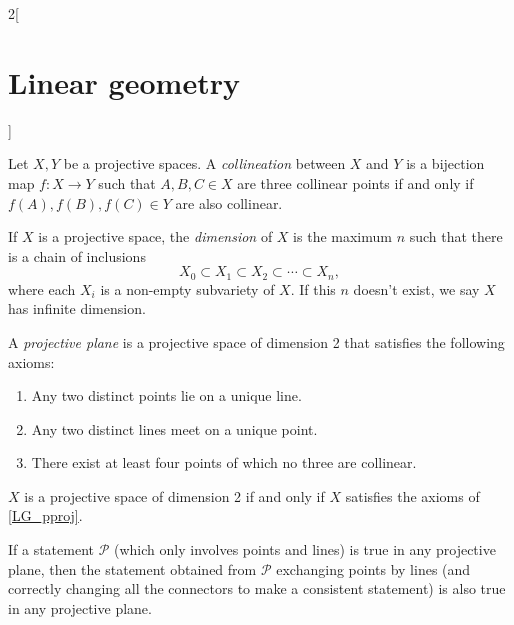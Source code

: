 \documentclass[../../../main.tex]{subfiles}
\begin{document}
\begin{multicols}{2}[\section{Linear geometry}]
\begin{proposition}
  \end{proposition}
  \begin{definition}
    Let $X,Y$ be a projective spaces. A \emph{collineation} between $X$ and $Y$ is a bijection map $f:X\rightarrow Y$ such that $A,B,C\in X$ are three collinear points if and only if $f(A),f(B),f(C)\in Y$ are also collinear.
  \end{definition}
  \begin{definition}
    If $X$ is a projective space, the \emph{dimension} of $X$ is the maximum $n$ such that there is a chain of inclusions $$X_0\subset X_1\subset X_2 \subset\cdots\subset X_n,$$ where each $X_i$ is a non-empty subvariety of $X$. If this $n$ doesn't exist, we say $X$ has infinite dimension.
  \end{definition}
  \begin{definition}\label{LG_pproj}
    A \emph{projective plane} is a projective space of dimension 2 that satisfies the following axioms:
    \begin{enumerate}
      \item Any two distinct points lie on a unique line.
      \item Any two distinct lines meet on a unique point.
      \item There exist at least four points of which no three are collinear.
    \end{enumerate}
  \end{definition}
  \begin{theorem}
    $X$ is a projective space of dimension 2 if and only if $X$ satisfies the axioms of \cref{LG_pproj}.
  \end{theorem}
  \begin{theorem}
    If a statement $\mathcal{P}$ (which only involves points and lines) is true in any projective plane, then the statement obtained from $\mathcal{P}$ exchanging points by lines (and correctly changing all the connectors to make a consistent statement) is also true in any projective plane.
  \end{theorem}

\end{multicols}
\end{document}
